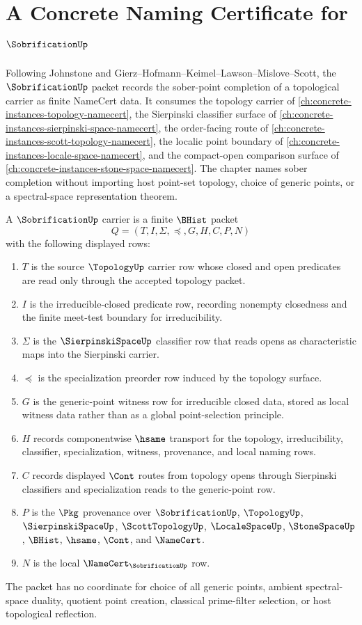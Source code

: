 \chapter{A Concrete Naming Certificate for $\SobrificationUp$}
\label{ch:concrete-instances-sobrification-namecert}

Following Johnstone and Gierz--Hofmann--Keimel--Lawson--Mislove--Scott, the $\SobrificationUp$ packet records the sober-point completion of a topological carrier as finite NameCert data. It consumes the topology carrier of \autoref{ch:concrete-instances-topology-namecert}, the Sierpinski classifier surface of \autoref{ch:concrete-instances-sierpinski-space-namecert}, the order-facing route of \autoref{ch:concrete-instances-scott-topology-namecert}, the localic point boundary of \autoref{ch:concrete-instances-locale-space-namecert}, and the compact-open comparison surface of \autoref{ch:concrete-instances-stone-space-namecert}. The chapter names sober completion without importing host point-set topology, choice of generic points, or a spectral-space representation theorem.

\begin{definition}
\label{def:sobrification-carrier}
A $\SobrificationUp$ carrier is a finite $\BHist$ packet
$$
Q=(T,I,\Sigma,\preceq,G,H,C,P,N)
$$
with the following displayed rows:
\begin{enumerate}
\item $T$ is the source $\TopologyUp$ carrier row whose closed and open predicates are read only through the accepted topology packet.
\item $I$ is the irreducible-closed predicate row, recording nonempty closedness and the finite meet-test boundary for irreducibility.
\item $\Sigma$ is the $\SierpinskiSpaceUp$ classifier row that reads opens as characteristic maps into the Sierpinski carrier.
\item $\preceq$ is the specialization preorder row induced by the topology surface.
\item $G$ is the generic-point witness row for irreducible closed data, stored as local witness data rather than as a global point-selection principle.
\item $H$ records componentwise $\hsame$ transport for the topology, irreducibility, classifier, specialization, witness, provenance, and local naming rows.
\item $C$ records displayed $\Cont$ routes from topology opens through Sierpinski classifiers and specialization reads to the generic-point row.
\item $P$ is the $\Pkg$ provenance over $\SobrificationUp$, $\TopologyUp$, $\SierpinskiSpaceUp$, $\ScottTopologyUp$, $\LocaleSpaceUp$, $\StoneSpaceUp$, $\BHist$, $\hsame$, $\Cont$, and $\NameCert$.
\item $N$ is the local $\NameCert_{\SobrificationUp}$ row.
\end{enumerate}
The packet has no coordinate for choice of all generic points, ambient spectral-space duality, quotient point creation, classical prime-filter selection, or host topological reflection.
\end{definition}

